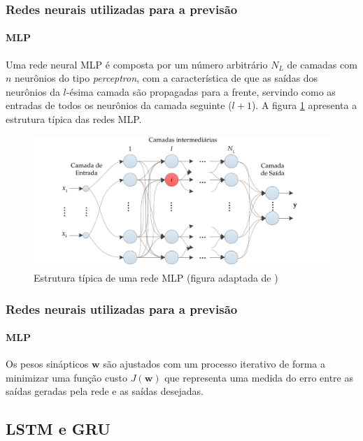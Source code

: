\documentclass[aspectratio=169]{beamer}
\begin{document}
\begin{frame}
\frametitle{Redes neurais utilizadas para a previsão}
\framesubtitle{MLP}
\justifying Uma rede neural MLP é composta por um número arbitrário $N_L$ de  camadas com $n$ neurônios do tipo \textit{perceptron}, com a característica de que as saídas dos neurônios da $l$-ésima camada são propagadas para a frente, servindo como as entradas de todos os neurônios da camada seguinte ($l+1$). A figura \ref{fig:mlp-architecture} apresenta a estrutura típica das redes MLP.
\begin{figure}[H]
\centering
\includegraphics[scale = 0.3]{mlp-network.pdf}
\caption{Estrutura típica de uma rede MLP (figura adaptada de \cite{boccato2013novas}) }
\label{fig:mlp-architecture}
\end{figure}
\end{frame}

\begin{frame}
\frametitle{Redes neurais utilizadas para a previsão}
\framesubtitle{MLP}
\justifying Os pesos sinápticos $\textbf{w}$ são ajustados com um processo iterativo de forma a minimizar uma função custo $J(\textbf{w})$ que representa uma medida do erro entre as saídas geradas pela rede e as saídas desejadas. 
\end{frame}

\subsection{LSTM e GRU}
\end{document}
